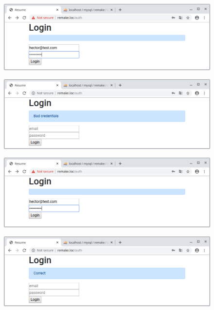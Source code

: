 \documentclass{article}
\begin{document}
\begin{figure}[h!]
  \centering
  \includegraphics[scale=0.5]{./Pictures/206_login_bad_credentials.png}
\end{figure}

\begin{figure}[h!]
  \centering
  \includegraphics[scale=0.5]{./Pictures/207_login_bad_credentials.png}
\end{figure}

\begin{figure}[h!]
  \centering
  \includegraphics[scale=0.5]{./Pictures/208_login_correct.png}
\end{figure}

\begin{figure}[h!]
  \centering
  \includegraphics[scale=0.5]{./Pictures/209_login_correct.png}
\end{figure}
\end{document}

